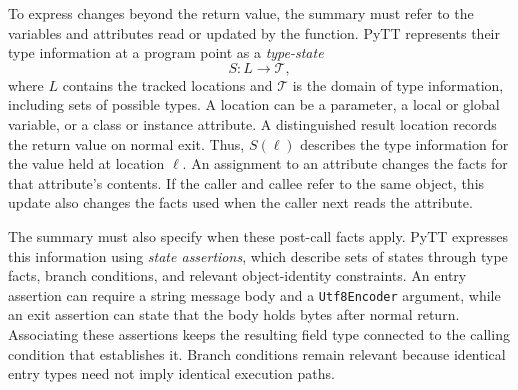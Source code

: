 

To express changes beyond the return value, the summary must refer to the
variables and attributes read or updated by the function. PyTT represents
their type information at a program point as a \emph{type-state}
\[
    S:L\rightarrow\mathcal{T},
\]
where $L$ contains the tracked locations and $\mathcal{T}$ is the domain
of type information, including sets of possible types. A location can be
a parameter, a local or global variable, or a class or instance
attribute. A distinguished result location records the return value on
normal exit. Thus, $S(\ell)$ describes the type information for the value
held at location $\ell$. An assignment to an attribute changes the facts
for that attribute's contents. If the caller and callee refer to the
same object, this update also changes the facts used when the caller
next reads the attribute.

The summary must also specify when these post-call facts apply. PyTT
expresses this information using \emph{state assertions}, which describe
sets of states through type facts, branch conditions, and relevant
object-identity constraints. An entry assertion can require a string
message body and a \texttt{Utf8Encoder} argument, while an exit assertion
can state that the body holds bytes after normal return. Associating
these assertions keeps the resulting field type connected to the
calling condition that establishes it. Branch conditions remain relevant
because identical entry types need not imply identical execution paths.


